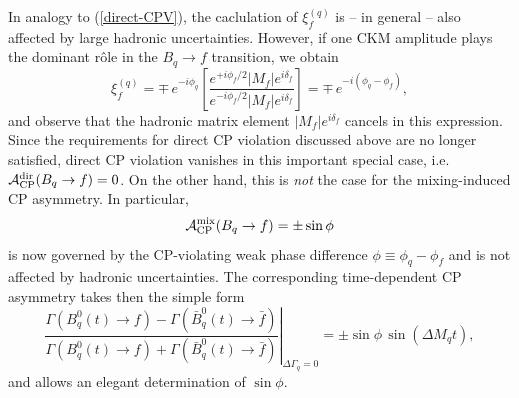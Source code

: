 \documentclass[12pt]{article}
\begin{document}
In analogy to (\ref{direct-CPV}), the caclulation
of $\xi_f^{(q)}$ is -- in general -- also affected by large hadronic uncertainties. 
However, if one CKM amplitude plays the dominant r\^ole in the $B_q\to f$
transition, we obtain
\begin{equation}\label{xi-si}
\xi_f^{(q)}=\mp\, e^{-i\phi_q}\left[
\frac{e^{+i\phi_f/2}|M_f|e^{i\delta_f}}{e^{-i\phi_f/2}|M_f|e^{i\delta_f}}
\right]=\mp\, e^{-i(\phi_q-\phi_f)},
\end{equation}
and observe that the hadronic matrix element $|M_f|e^{i\delta_f}$ 
cancels in this expression. Since the requirements for 
direct CP violation discussed above are no longer satisfied, direct CP violation 
vanishes in this important special case, i.e.\ 
${\cal A}^{\mbox{{\scriptsize dir}}}_{\mbox{{\scriptsize CP}}}
(B_q\to f)=0$. On the other hand, this is {\it not} the case for the mixing-induced 
CP asymmetry. In particular, 
\begin{equation}\label{Amix-simple}
{\cal A}^{\rm mix}_{\rm CP}(B_q\to f)=\pm\sin\phi
\end{equation}
is now governed by the CP-violating weak phase difference 
$\phi\equiv\phi_q-\phi_f$ and is not affected by hadronic 
uncertainties. The corresponding time-dependent CP asymmetry
takes then the simple form
\begin{equation}\label{Amix-t-simple}
\left.\frac{\Gamma(B^0_q(t)\to f)-
\Gamma(\bar B^0_q(t)\to \bar f)}{\Gamma(B^0_q(t)\to f)+
\Gamma(\bar B^0_q(t)\to \bar f)}\right|_{\Delta\Gamma_q=0}
=\pm\sin\phi\,\sin(\Delta M_q t),
\end{equation}
and allows an elegant determination of $\sin\phi$.


%
%
%
\end{document}
